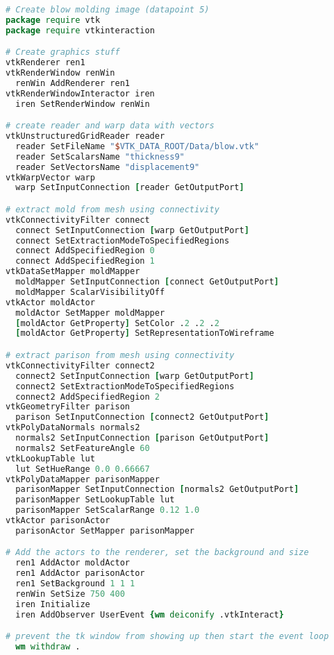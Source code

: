 \begin{lstlisting}[language=TCL, caption={Script to generate the blow molding image.}]
# Create blow molding image (datapoint 5)
package require vtk
package require vtkinteraction

# Create graphics stuff
vtkRenderer ren1
vtkRenderWindow renWin
  renWin AddRenderer ren1
vtkRenderWindowInteractor iren
  iren SetRenderWindow renWin

# create reader and warp data with vectors
vtkUnstructuredGridReader reader
  reader SetFileName "$VTK_DATA_ROOT/Data/blow.vtk"
  reader SetScalarsName "thickness9"
  reader SetVectorsName "displacement9"
vtkWarpVector warp
  warp SetInputConnection [reader GetOutputPort]

# extract mold from mesh using connectivity
vtkConnectivityFilter connect
  connect SetInputConnection [warp GetOutputPort]
  connect SetExtractionModeToSpecifiedRegions
  connect AddSpecifiedRegion 0
  connect AddSpecifiedRegion 1
vtkDataSetMapper moldMapper
  moldMapper SetInputConnection [connect GetOutputPort]
  moldMapper ScalarVisibilityOff
vtkActor moldActor
  moldActor SetMapper moldMapper
  [moldActor GetProperty] SetColor .2 .2 .2
  [moldActor GetProperty] SetRepresentationToWireframe

# extract parison from mesh using connectivity
vtkConnectivityFilter connect2
  connect2 SetInputConnection [warp GetOutputPort]
  connect2 SetExtractionModeToSpecifiedRegions
  connect2 AddSpecifiedRegion 2
vtkGeometryFilter parison
  parison SetInputConnection [connect2 GetOutputPort]
vtkPolyDataNormals normals2
  normals2 SetInputConnection [parison GetOutputPort]
  normals2 SetFeatureAngle 60
vtkLookupTable lut
  lut SetHueRange 0.0 0.66667
vtkPolyDataMapper parisonMapper
  parisonMapper SetInputConnection [normals2 GetOutputPort]
  parisonMapper SetLookupTable lut
  parisonMapper SetScalarRange 0.12 1.0
vtkActor parisonActor
  parisonActor SetMapper parisonMapper

# Add the actors to the renderer, set the background and size
  ren1 AddActor moldActor
  ren1 AddActor parisonActor
  ren1 SetBackground 1 1 1
  renWin SetSize 750 400
  iren Initialize
  iren AddObserver UserEvent {wm deiconify .vtkInteract}

# prevent the tk window from showing up then start the event loop
  wm withdraw .
\end{lstlisting}

